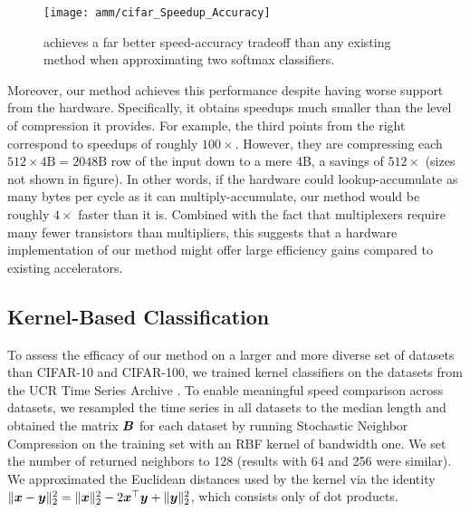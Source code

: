 \begin{figure}[h]
\begin{center}
\texttt{[image: amm/cifar\_Speedup\_Accuracy]}
\caption{\oursp achieves a far better speed-accuracy tradeoff than any existing method when approximating two softmax classifiers.}
\label{fig:cifar}
\end{center}
\end{figure}

Moreover, our method achieves this performance despite having worse support from the hardware. Specifically, it obtains speedups much smaller than the level of compression it provides. For example, the third points from the right correspond to speedups of roughly $100\times$. However, they are compressing each $512 \times 4\text{B} = 2048\text{B}$ row of the input down to a mere 4B, a savings of $512\times$ (sizes not shown in figure). In other words, if the hardware could lookup-accumulate as many bytes per cycle as it can multiply-accumulate, our method would be roughly $4\times$ faster than it is. Combined with the fact that multiplexers require many fewer transistors than multipliers, this suggests that a hardware implementation of our method might offer large efficiency gains compared to existing accelerators.

\vspace{-2mm}
\subsection{Kernel-Based Classification}
\vspace{-.5mm}

To assess the efficacy of our method on a larger and more diverse set of datasets than CIFAR-10 and CIFAR-100, we trained kernel classifiers on the datasets from the UCR Time Series Archive \cite{UCRArchive2018}. To enable meaningful speed comparison across datasets, we resampled the time series in all datasets to the median length and obtained the matrix $\bm{B}$ for each dataset by running Stochastic Neighbor Compression \cite{snc} on the training set with an RBF kernel of bandwidth one. We set the number of returned neighbors to 128 (results with 64 and 256 were similar). We approximated the Euclidean distances used by the kernel via the identity $\lVert\bm{x} - \bm{y}\rVert_2^2 = \lVert\bm{x}\rVert_2^2 - 2\bm{x}^\top \bm{y} + \lVert\bm{y}\rVert_2^2$, which consists only of dot products.

